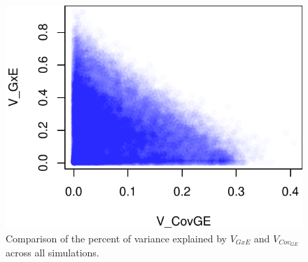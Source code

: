 \documentclass[11pt, oneside]{amsart}
\begin{document}
\renewcommand\thefigure{S3}
\begin{figure}[h]
\begin{center}
\includegraphics[width=6in]{Figs/VgxevsVcov.pdf}
\end{center}
\label{Fig: }
\caption[Comparison of the percent of variance explained by $V_{GxE}$ and $V_{Cov_{GE}}$ across all simulations.]{Comparison of the percent of variance explained by $V_{GxE}$ and $V_{Cov_{GE}}$ across all simulations.  }
\end{figure}

\clearpage
\newpage
\end{document}
